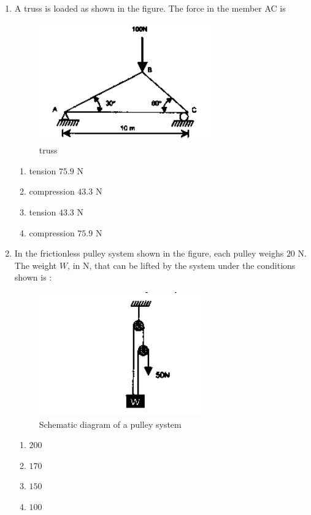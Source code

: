 \documentclass[journal,12pt,onecolumn]{IEEEtran}
\theoremstyle{remark}
\begin{document}
\begin{enumerate}
\hfill{}
\begin{multicols}{4}
\begin{enumerate}
\item $6030$
\item $5840$
\item $5750$
\item $5630$
\end{enumerate}
\end{multicols}

\item A truss is loaded as shown in the figure. The force in the member AC is

\hfill{}
\begin{figure}[H]
  \centering
  \includegraphics[width=0.4\columnwidth]{figs/truss.png}
  \caption{truss}
  \label{fig:truss}
\end{figure}
\begin{multicols}{2}
\begin{enumerate}
\item tension $75.9$ N
\item compression $43.3$ N
\item tension $43.3$ N
\item compression $75.9$ N
\end{enumerate}
\end{multicols}

\item In the frictionless pulley system shown in the figure, each pulley weighs $20$ N.  
The weight \( W \), in N, that can be lifted by the system under the conditions shown is $\colon$


\hfill{}

\begin{figure}[H]
  \centering
  \includegraphics[width=0.4\columnwidth]{figs/pulley.png}
  \caption{Schematic diagram of a pulley system}
  \label{fig:pulley}
\end{figure}
\begin{multicols}{4}
\begin{enumerate}
\item $200$
\item $170$
\item $150$
\item $100$
\end{enumerate}
\end{multicols}


\end{enumerate}
\end{document}
